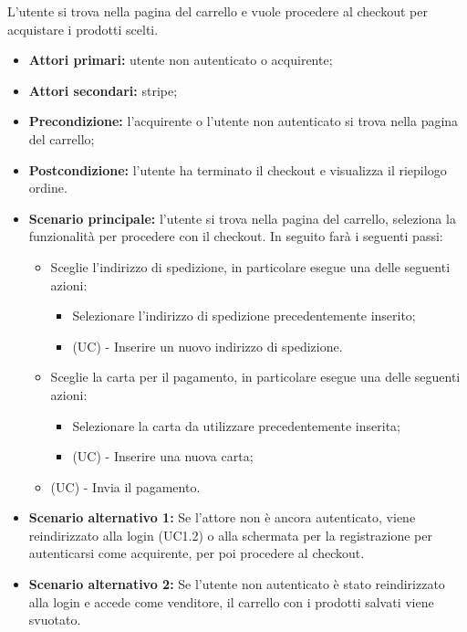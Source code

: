 L'utente si trova nella pagina del carrello e vuole procedere al checkout per acquistare i prodotti scelti.
\begin{itemize}
    \item \textbf{Attori primari:} utente non autenticato o acquirente;
    \item \textbf{Attori secondari:} stripe;
    \item \textbf{Precondizione:} l'acquirente o l'utente non autenticato si trova nella pagina del carrello;
    \item \textbf{Postcondizione:} l'utente ha terminato il checkout e visualizza il riepilogo ordine.
    \item \textbf{Scenario principale:} l'utente si trova nella pagina del carrello, seleziona la funzionalità per procedere con il checkout. In seguito farà i seguenti passi:
    \begin{itemize}
    	\item Sceglie l'indirizzo di spedizione, in particolare esegue una delle seguenti azioni: 
    	\begin{itemize}
    		\item Selezionare l'indirizzo di spedizione precedentemente inserito;
    		\item (UC) - Inserire un nuovo indirizzo di spedizione.
    	\end{itemize}
    	\item Sceglie la carta per il pagamento, in particolare esegue una delle seguenti azioni: 
    	\begin{itemize}
    		\item Selezionare la carta da utilizzare precedentemente inserita;
    		\item (UC) - Inserire una nuova carta;
    	\end{itemize}
        \item (UC) - Invia il pagamento.
    \end{itemize}
    \item \textbf{Scenario alternativo 1:} Se l'attore non è ancora autenticato, viene reindirizzato alla login (UC1.2) o alla schermata per la registrazione per autenticarsi come acquirente, per poi procedere al checkout.
    \item \textbf{Scenario alternativo 2:} Se l'utente non autenticato è stato reindirizzato alla login e accede come venditore, il carrello con i prodotti salvati viene svuotato.
\end{itemize}

\resetSubUC

